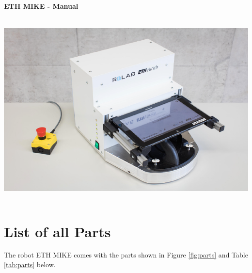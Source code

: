 \documentclass[10pt,oneside,a4paper]{article}
\begin{document}
\begin{center}
{\begin{center}
\vspace{-21cm}	
{\Huge \bf ETH MIKE - Manual \par}


\vspace{3cm}
{\hspace*{-1.2cm}	\includegraphics[height=10cm]{images/Hardware/ETHMIKE2.png}}

\end{center}
}
\end{center}

\clearpage

\pagestyle{plain}



\setcounter{tocdepth}{2}

\tableofcontents
\cleardoublepage




\section{List of all Parts}
The robot ETH MIKE comes with the parts shown in Figure \ref{fig:parts} and Table \ref{tab:parts} below.
\end{document}
